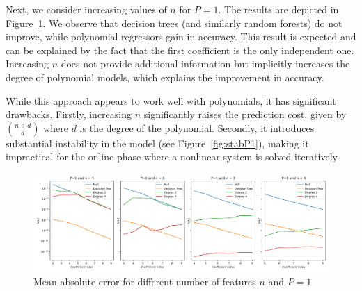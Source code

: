 \documentclass[graybox]{svmult}
\begin{document}


% 

Next, we consider increasing values of $n$ for $P=1$. The results are depicted in Figure~\ref{fig:P1n}. We observe that decision trees (and similarly random forests) do not improve, while polynomial regressors gain in accuracy. This result is expected and can be explained by the fact that the first coefficient is the only independent one. Increasing $n$ does not provide additional information but implicitly increases the degree of polynomial models, which explains the improvement in accuracy.

While this approach appears to work well with polynomials, it has significant drawbacks. Firstly, increasing $n$ significantly raises the prediction cost, given by $\binom{n+d}{d}$ where $d$ is the degree of the polynomial. Secondly, it introduces substantial instability in the model (see Figure~\ref{fig:stabP1}), making it impractical for the online phase where a nonlinear system is solved iteratively. 

\begin{figure}[!hb]
    \centering
\includegraphics[width=1.0\textwidth] {P1n.png}
    \caption{Mean absolute error for different number of features $n$ and $P=1$}
    \label{fig:P1n}
\end{figure}
\end{document}
